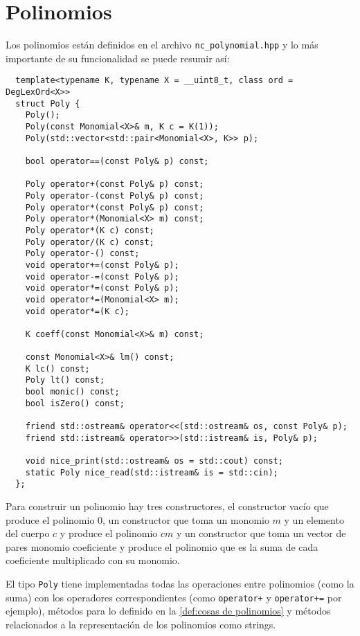 \documentclass[12pt]{report}
\theoremstyle{customstyle}
\theoremstyle{factstyle}
\begin{document}
\section{Polinomios}

Los polinomios están definidos en el archivo \texttt{nc\_polynomial.hpp} y lo más importante de su funcionalidad se puede resumir así:

\begin{verbatim}
  template<typename K, typename X = __uint8_t, class ord = DegLexOrd<X>>
  struct Poly {
    Poly();
    Poly(const Monomial<X>& m, K c = K(1));
    Poly(std::vector<std::pair<Monomial<X>, K>> p);

    bool operator==(const Poly& p) const;

    Poly operator+(const Poly& p) const;
    Poly operator-(const Poly& p) const;
    Poly operator*(const Poly& p) const;
    Poly operator*(Monomial<X> m) const;
    Poly operator*(K c) const;
    Poly operator/(K c) const;
    Poly operator-() const;
    void operator+=(const Poly& p);
    void operator-=(const Poly& p);
    void operator*=(const Poly& p);
    void operator*=(Monomial<X> m);
    void operator*=(K c);

    K coeff(const Monomial<X>& m) const;

    const Monomial<X>& lm() const;
    K lc() const;
    Poly lt() const;
    bool monic() const;
    bool isZero() const;

    friend std::ostream& operator<<(std::ostream& os, const Poly& p);
    friend std::istream& operator>>(std::istream& is, Poly& p);

    void nice_print(std::ostream& os = std::cout) const;
    static Poly nice_read(std::istream& is = std::cin);
  };
\end{verbatim}

Para construir un polinomio hay tres constructores, el constructor vacío que produce el polinomio $0$, un constructor que toma un monomio $m$ y un elemento del cuerpo $c$ y produce el polinomio $cm$ y un constructor que toma un vector de pares monomio coeficiente y produce el polinomio que es la suma de cada coeficiente multiplicado con su monomio.

El tipo \texttt{Poly} tiene implementadas todas las operaciones entre polinomios (como la suma) con los operadores correspondientes (como \texttt{operator+} y \texttt{operator+=} por ejemplo), métodos para lo definido en la \cref{def:cosas de polinomios} y métodos relacionados a la representación de los polinomios como strings.
\end{document}
